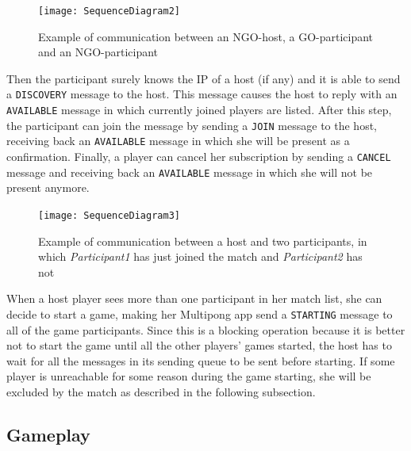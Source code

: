 \begin{figure}[h]
    \centering
    \texttt{[image: SequenceDiagram2]}
    \caption{Example of communication between an NGO-host, a GO-participant
     and an NGO-participant}
    \label{fig:seqDiagram2}
\end{figure}

Then the participant surely knows the IP of a host (if any) and it is able to
send a \texttt{DISCOVERY} message to the host. This message causes the host to
reply with an \texttt{AVAILABLE} message in which currently joined players are
listed. After this step, the participant can join the message by sending a
\texttt{JOIN} message to the host, receiving back an \texttt{AVAILABLE} message
in which she will be present as a confirmation. Finally, a player can cancel
her subscription by sending a \texttt{CANCEL} message and receiving back an
\texttt{AVAILABLE} message in which she will not be present anymore.

\begin{figure}[h]
    \centering
    \texttt{[image: SequenceDiagram3]}
    \caption{Example of communication between a host and two participants,
     in which \emph{Participant1} has just joined the match and
     \emph{Participant2} has not}
    \label{fig:seqDiagram3}
\end{figure}

When a host player sees more than one participant in her match list, she can
decide to start a game, making her Multipong app send a \texttt{STARTING}
message to all of the game participants. Since this is a blocking operation
because it is better not to start the game until all the other players' games
started, the host has to wait for all the messages in its sending queue to be
sent before starting. If some player is unreachable for some reason
during the game starting, she will be excluded by the match as described in
the following subsection.



\subsection{Gameplay}



